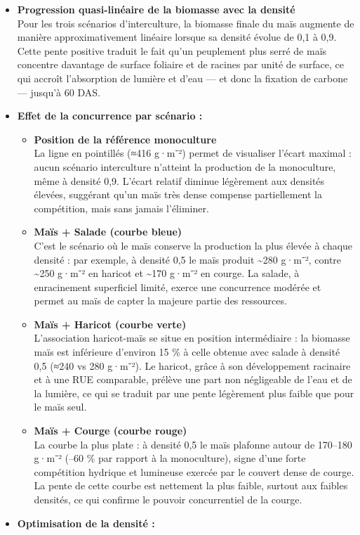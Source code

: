 \documentclass[
]{article}
\begin{document}
\begin{itemize}
\item
  \textbf{Progression quasi-linéaire de la biomasse avec la densité\\
  }Pour les trois scénarios d'interculture, la biomasse finale du maïs
  augmente de manière approximativement linéaire lorsque sa densité
  évolue de 0,1 à 0,9. Cette pente positive traduit le fait qu'un
  peuplement plus serré de maïs concentre davantage de surface foliaire
  et de racines par unité de surface, ce qui accroît l'absorption de
  lumière et d'eau --- et donc la fixation de carbone --- jusqu'à 60
  DAS.
\item
  \textbf{Effet de la concurrence par scénario :}

  \begin{itemize}
  \item
    \textbf{Position de la référence monoculture\\
    }La ligne en pointillés (≈416 g·m⁻²) permet de visualiser l'écart
    maximal : aucun scénario interculture n'atteint la production de la
    monoculture, même à densité 0,9. L'écart relatif diminue légèrement
    aux densités élevées, suggérant qu'un maïs très dense compense
    partiellement la compétition, mais sans jamais l'éliminer.
  \item
    \textbf{Maïs + Salade (courbe bleue)\\
    }C'est le scénario où le maïs conserve la production la plus élevée
    à chaque densité : par exemple, à densité 0,5 le maïs produit
    \textasciitilde280 g·m⁻², contre \textasciitilde250 g·m⁻² en haricot
    et \textasciitilde170 g·m⁻² en courge. La salade, à enracinement
    superficiel limité, exerce une concurrence modérée et permet au maïs
    de capter la majeure partie des ressources.
  \item
    \textbf{Maïs + Haricot (courbe verte)\\
    }L'association haricot-maïs se situe en position intermédiaire : la
    biomasse maïs est inférieure d'environ 15 \% à celle obtenue avec
    salade à densité 0,5 (≈240 vs 280 g·m⁻²). Le haricot, grâce à son
    développement racinaire et à une RUE comparable, prélève une part
    non négligeable de l'eau et de la lumière, ce qui se traduit par une
    pente légèrement plus faible que pour le maïs seul.
  \item
    \textbf{Maïs + Courge (courbe rouge)\\
    }La courbe la plus plate : à densité 0,5 le maïs plafonne autour de
    170--180 g·m⁻² (--60 \% par rapport à la monoculture), signe d'une
    forte compétition hydrique et lumineuse exercée par le couvert dense
    de courge. La pente de cette courbe est nettement la plus faible,
    surtout aux faibles densités, ce qui confirme le pouvoir
    concurrentiel de la courge.
  \end{itemize}
\item
  \textbf{Optimisation de la densité :}


\end{itemize}
\end{document}

